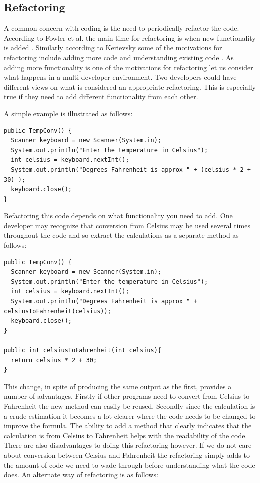 \documentclass[12pt]{CRPITStyle}
\renewcommand{\cite}{\citep}
\begin{document}
\subsection{Refactoring}
A common concern with coding is the need to periodically refactor the code. According to Fowler et al. the main time for refactoring is when new functionality is added \cite{Fowler1999}. Similarly according to Kerievsky some of the motivations for refactoring include adding more code and understanding existing code \cite{Kerievsky2004}. As adding more functionality is one of the motivations for refactoring let us consider what happens in a multi-developer environment. Two developers could have different views on what is considered an appropriate refactoring. This is especially true if they need to add different functionality from each other. 

A simple example is illustrated as follows:
\begin{verbatim}
public TempConv() {
  Scanner keyboard = new Scanner(System.in);
  System.out.println("Enter the temperature in Celsius");
  int celsius = keyboard.nextInt();
  System.out.println("Degrees Fahrenheit is approx " + (celsius * 2 + 30) );
  keyboard.close();
}
\end{verbatim}

Refactoring this code depends on what functionality you need to add. One developer may recognize that conversion from Celsius may be used several times throughout the code and so extract the calculations as a separate method as follows:

\begin{verbatim}
public TempConv() {
  Scanner keyboard = new Scanner(System.in);
  System.out.println("Enter the temperature in Celsius");
  int celsius = keyboard.nextInt();
  System.out.println("Degrees Fahrenheit is approx " + celsiusToFahrenheit(celsius));
  keyboard.close();
}

public int celsiusToFahrenheit(int celsius){
  return celsius * 2 + 30;
}
\end{verbatim}

This change, in spite of producing the same output as the first, provides a number of advantages. Firstly if other programs need to convert from Celsius to Fahrenheit the new method can easily be reused. Secondly since the calculation is a crude estimation it becomes a lot clearer where the code needs to be changed to improve the formula. The ability to add a method that clearly indicates that the calculation is from Celsius to Fahrenheit helps with the readability of the code. There are also disadvantages to doing this refactoring however. If we do not care about conversion between Celsius and Fahrenheit the refactoring simply adds to the amount of code we need to wade through before understanding what the code does. An alternate way of refactoring is as follows:
\end{document}
